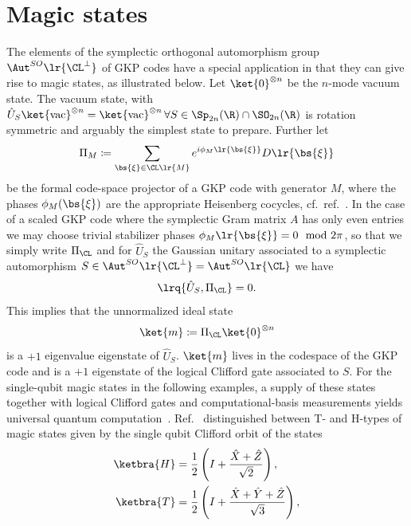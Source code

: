 \documentclass[a4paper, aps, pra, 11pt, onecolumn, tightenlines, superscriptaddress]{revtex4-2}
\begin{document}
\section{Magic states}\label{app:Magic}
The elements of the symplectic orthogonal automorphism group $\Aut^{SO}\lr{\CL^{\perp}}$ of GKP codes have a special application in that they can give rise to magic states, as illustrated below.
Let $\ket{0}^{\otimes n}$ be the $n$-mode vacuum state. 
The vacuum state, with $\hat{U}_S\ket{\rm vac}^{\otimes n}=\ket{\rm vac}^{\otimes n}\, \forall S\in \Sp_{2n}(\R)\cap \SO_{2n}(\R)$ is rotation symmetric and arguably the simplest state to prepare. 
Further let 
\begin{equation}
\Pi_{M}\coloneqq\sum_{\bs{\xi}\in \CL\lr{M}} e^{i\phi_M\lr{\bs{\xi}}} D\lr{\bs{\xi}} 
\end{equation}
be the formal code-space projector of a GKP code with generator $M$, where the phases $\phi_M(\bs{\xi})$ are the appropriate Heisenberg cocycles, cf.\ ref.~\cite{Conrad_2022}. In the case of a scaled GKP code where the symplectic Gram matrix $A$ has only even entries we may choose trivial stabilizer phases $\phi_M\lr{\bs{\xi}} =0 \mod 2\pi$, so that we simply write $\Pi_{\CL}$ and for $\hat{U}_S$ the Gaussian unitary associated to a symplectic automorphism $S\in\Aut^{SO}\lr{\CL^{\perp}}=\Aut^{SO}\lr{\CL}$ we have
\begin{equation}
\lrq{\hat{U}_S, \Pi_{\CL}}=0.
\end{equation} 
This implies that the unnormalized ideal state
\begin{equation}
\ket{m}\coloneqq\Pi_{\CL}\ket{0}^{\otimes n} 
\end{equation}
is a $+1$ eigenvalue eigenstate of $\hat{U}_S$. $\ket{m}$ lives in the codespace of the GKP code and is a $+1$ eigenstate of the logical Clifford gate associated to $S$. For the single-qubit magic states in the following examples, a supply of these states together with logical Clifford gates and computational-basis measurements yields universal quantum computation~\cite{Bravyi_2005}.
Ref.~\cite{Bravyi_2005} distinguished between T- and H-types of magic states given by the single qubit Clifford orbit of the states \cite{Bravyi_2005}
\begin{align}
\ketbra{H}&=\frac{1}{2}\left(I+\frac{\hat{X}+\hat{Z}}{\sqrt{2}}\right),\\
\ketbra{T}&=\frac{1}{2}\left(I+\frac{\hat{X}+\hat{Y}+\hat{Z}}{\sqrt{3}}\right),
\end{align} 
\end{document}
